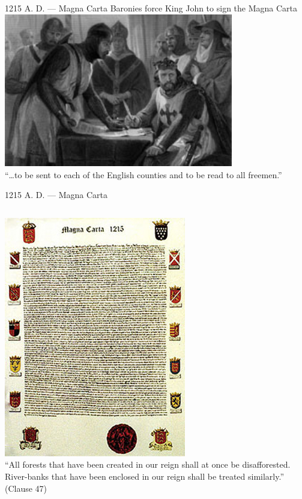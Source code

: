 \begin{frame}{1215 A. D. --- Magna Carta}
    \centering
    Baronies force King John to sign the Magna Carta \\
    \includegraphics[width=0.75\textwidth]{img/king-john.png} \\
    ``\ldots to be sent to each of the English counties and to be read to all freemen.'' \\
\end{frame}

\begin{frame}{1215 A. D. --- Magna Carta}
    \begin{columns}[onlytextwidth]
            \centering
            \includegraphics[height=0.55\textheight]{img/magna-carta.png} \\

            ``All forests that have been created in our reign shall at once be disafforested.  River-banks that have been enclosed in our reign shall be treated similarly.'' \\
            (Clause 47)  \\
    \end{columns}
\end{frame}

